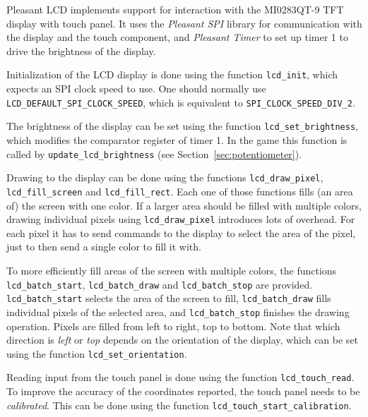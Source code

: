 Pleasant LCD implements support for interaction with the MI0283QT-9 TFT display
with touch panel. It uses the \emph{Pleasant SPI} library for communication
with the display and the touch component, and \emph{Pleasant Timer} to set up
timer 1 to drive the brightness of the display.

Initialization of the LCD display is done using the function
\texttt{lcd\_init}, which expects an SPI clock speed to use. One should
normally use \texttt{LCD\_DEFAULT\_SPI\_CLOCK\_SPEED}, which is equivalent to
\texttt{SPI\_CLOCK\_SPEED\_DIV\_2}.

The brightness of the display can be set using the function
\texttt{lcd\_set\_brightness}, which modifies the comparator register of timer
1. In the game this function is called by \texttt{update\_lcd\_brightness} (see
Section~\ref{sec:potentiometer}).

\begin{sloppypar}
  Drawing to the display can be done using the functions
  \texttt{lcd\_draw\_pixel}, \texttt{lcd\_fill\_screen} and
  \texttt{lcd\_fill\_rect}. Each one of those functions fills (an area of) the
  screen with one color. If a larger area should be filled with multiple
  colors, drawing individual pixels using \texttt{lcd\_draw\_pixel} introduces
  lots of overhead. For each pixel it has to send commands to the display to
  select the area of the pixel, just to then send a single color to fill it
  with.
\end{sloppypar}

\begin{sloppypar}
  To more efficiently fill areas of the screen with multiple colors, the
  functions \texttt{lcd\_batch\_start}, \texttt{lcd\_batch\_draw} and
  \texttt{lcd\_batch\_stop} are provided. \texttt{lcd\_batch\_start} selects
  the area of the screen to fill, \texttt{lcd\_batch\_draw} fills individual
  pixels of the selected area, and \texttt{lcd\_batch\_stop} finishes the
  drawing operation. Pixels are filled from left to right, top to bottom. Note
  that which direction is \emph{left} or \emph{top} depends on the orientation
  of the display, which can be set using the function
  \texttt{lcd\_set\_orientation}.
\end{sloppypar}

Reading input from the touch panel is done using the function
\texttt{lcd\_touch\_read}. To improve the accuracy of the coordinates reported,
the touch panel needs to be \emph{calibrated}. This can be done using the
function \texttt{lcd\_touch\_start\_calibration}.

